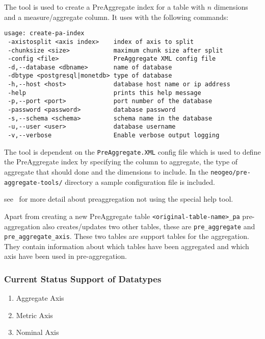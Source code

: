 The tool is used to create a PreAggregate index for a table with $\textit{n}$ dimensions and a measure/aggregate column. It uses with the following commands:
\begin{lstlisting}[basicstyle=\small]
usage: create-pa-index
 -axistosplit <axis index>    index of axis to split
 -chunksize <size>            maximum chunk size after split
 -config <file>               PreAggregate XML config file
 -d,--database <dbname>       name of database
 -dbtype <postgresql|monetdb> type of database
 -h,--host <host>             database host name or ip address
 -help                        prints this help message
 -p,--port <port>             port number of the database
 -password <password>         database password
 -s,--schema <schema>         schema name in the database
 -u,--user <user>             database username
 -v,--verbose                 Enable verbose output logging
\end{lstlisting}
The tool is dependent on the \lstinline|PreAggregate.XML| config file which is used to define the PreAggregate index by specifying the column to aggregate, the type of aggregate that should done and the dimensions to include. In the \lstinline|neogeo/pre-aggregate-tools/| directory a sample configuration file is included.


see~ for more detail about preaggregation not using the special help tool.

Apart from creating a new PreAggregate table \lstinline|<original-table-name>_pa| pre-aggregation also creates/updates two other tables, these are \lstinline|pre_aggregate| and \lstinline|pre_aggregate_axis|. These two tables are support tables for the aggregation. They contain information about which tables have been aggregated and which axis have been used in pre-aggregation.
\subsubsection{Current Status Support of Datatypes}
\begin{enumerate}
	\item Aggregate Axis
	\item Metric Axis
	\item Nominal Axis
\end{enumerate}

